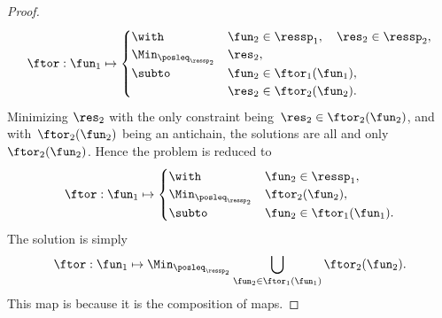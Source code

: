 \begin{proof}
    \begin{equation}
        \ftor:\fun_{1}\mapsto\begin{cases}
            \with                       & \fun_{2}\in\ressp_{1},\quad\res_{2}\in\ressp_{2}, \\
            \Min_{\posleq_{\ressp_{2}}} & \res_{2},                                         \\
            \subto                      & \fun_{2}\in\ftor_{1}(\fun_{1}),                   \\
                                        & \res_{2}\in\ftor_{2}(\fun_{2}).
        \end{cases}\label{eq:dede-2}
    \end{equation}
    Minimizing $\res_{2}$ with the only constraint being~$\res_{2}\in\ftor_{2}(\fun_{2})$, and with~$\ftor_{2}(\fun_{2})$ being an antichain, the solutions are all and only~$\ftor_{2}(\fun_{2})$.
    Hence the problem is reduced to
    \begin{equation}
        \ftor:\fun_{1}\mapsto\begin{cases}
            \with                       & \fun_{2}\in\ressp_{1},          \\
            \Min_{\posleq_{\ressp_{2}}} & \ftor_{2}(\fun_{2}),            \\
            \subto                      & \fun_{2}\in\ftor_{1}(\fun_{1}).
        \end{cases}\label{eq:dede-2-1}
    \end{equation}
    The solution is simply
    \begin{equation}
        \ftor:\fun_{1}\mapsto\Min_{\posleq_{\ressp_{2}}}\bigcup_{\fun_{2}\in\ftor_{1}(\fun_{1})}\ftor_{2}(\fun_{2}).
        \label{eq:ora}
    \end{equation}
    This map is \scottcontinuous because it is the composition of \scottcontinuous maps.
\end{proof}

